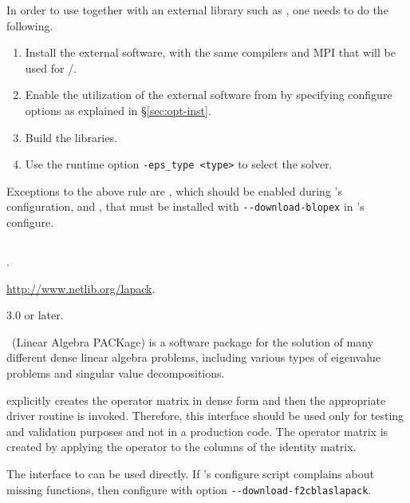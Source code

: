 	In order to use \slepc together with an external library such as \arpack, one needs to do the following.
	\begin{enumerate}
	\item Install the external software, with the same compilers and MPI that will be used for \petsc/\slepc.
	\item Enable the utilization of the external software from \slepc by specifying configure options as explained in \S\ref{sec:opt-inst}.
 	\item Build the \slepc libraries.
	\item Use the runtime option \Verb!-eps_type <type>! to select the solver.
	\end{enumerate}

	Exceptions to the above rule are \lapack, which should be enabled during \petsc's configuration, and \blopex, that must be installed with \Verb!--download-blopex! in \slepc's configure.

\subsection*{\underline{\lapack}}
	\begin{description}
	\setlength{\itemsep}{0pt}
	\item[References.]\citep{Anderson:1992:LUG}.
	\item[Website.] \url{http://www.netlib.org/lapack}.
	\item[Version.] 3.0 or later.
	\item[Summary.] \lapack\ (Linear Algebra PACKage) is a software package for the solution of many different dense linear algebra problems, including various types of eigenvalue problems and singular value decompositions.

	\slepc explicitly creates the operator matrix in dense form and then the appropriate \lapack driver routine is invoked. Therefore, this interface should be used only for testing and validation purposes and not in a production code. The operator matrix is created by applying the operator to the columns of the identity matrix.

	\item[Installation.]
	The \slepc interface to \lapack can be used directly. If \slepc's configure script complains about missing \lapack functions, then configure \petsc with option \texttt{-{}-download-f2cblaslapack}.
	\end{description}

